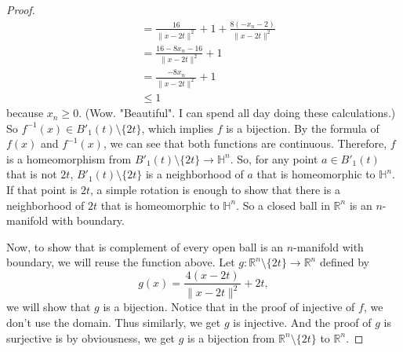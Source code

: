 \documentclass[12pt, a4paper]{article}
\theoremstyle{plain}
\newcommand{\Hs}{\mathbb{H}}
\newcommand{\R}{\mathbb{R}}
\begin{document}
\begin{proof}
\begin{align*}
	&=\frac{16}{\|x-2t\|^2}+1+\frac{8(-x_n-2)}{\|x-2t\|^2}\\
	&=\frac{16-8x_n-16}{\|x-2t\|^2}+1\\
	&=\frac{-8x_n}{\|x-2t\|^2}+1\\
	&\leq 1
	\end{align*}
	because $x_n\geq 0$. (Wow. "Beautiful". I can spend all day doing these calculations.) So $f^{-1}(x)\in B'_1(t)\setminus\{2t\}$, which implies $f$ is a bijection. By the formula of $f(x)$ and $f^{-1}(x)$, we can see that both functions are continuous. Therefore, $f$ is a homeomorphism from $B'_1(t)\setminus \{2t\}\rightarrow \Hs^n$. So, for any point $a\in B'_1(t)$ that is not $2t$, $B'_1(t)\setminus\{2t\}$ is a neighborhood of $a$ that is homeomorphic to $\Hs^n$. If that point is $2t$, a simple rotation is enough to show that there is a neighborhood of $2t$ that is homeomorphic to $\Hs^n$. So a closed ball in $\R^n$ is an $n$-manifold with boundary. 
	
	Now, to show that is complement of every open ball is an $n$-manifold with boundary, we will reuse the function above. Let $g:\R^n\setminus\{2t\}\rightarrow\R^n$ defined by 
	\[
	g(x)=\frac{4(x-2t)}{\|x-2t\|^2}+2t,
	\]
	we will show that $g$ is a bijection. Notice that in the proof of injective of $f$, we don't use the domain. Thus similarly, we get $g$ is injective. And the proof of $g$ is surjective is by obviousness, we get $g$ is a bijection from $\R^n\setminus \{2t\}$ to $\R^n$. 
	

\end{proof}
\end{document}
